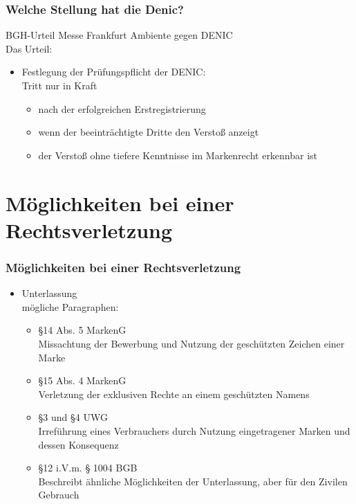 \documentclass{beamer}
\begin{document}
	\begin{frame}
		\frametitle{Welche Stellung hat die Denic?}
		BGH-Urteil \glqq Messe Frankfurt Ambiente gegen DENIC\grqq\\
		Das Urteil:
		\begin{itemize}
			\item Festlegung der Prüfungspflicht der DENIC:\\Tritt nur in Kraft
			\begin{itemize}
				\item nach der erfolgreichen Erstregistrierung
				\item wenn der beeinträchtigte Dritte den Verstoß anzeigt
				\item der Verstoß ohne tiefere Kenntnisse im Markenrecht erkennbar ist
			\end{itemize}
		\end{itemize}
	\end{frame}
	
	\section{Möglichkeiten bei einer Rechtsverletzung}
	
	\begin{frame}
		\frametitle{Möglichkeiten bei einer Rechtsverletzung}
		\begin{itemize}
			\item Unterlassung\\mögliche Paragraphen:
			\begin{itemize}
				\item §14 Abs. 5 MarkenG\\Missachtung der Bewerbung und Nutzung der geschützten Zeichen einer Marke
				\item §15 Abs. 4 MarkenG\\Verletzung der exklusiven Rechte an einem geschützten Namens
				\item §3 und §4 UWG\\Irreführung eines Verbrauchers durch Nutzung eingetragener Marken und dessen Konsequenz
				\item §12 i.V.m. § 1004 BGB\\Beschreibt ähnliche Möglichkeiten der Unterlassung, aber für den Zivilen Gebrauch
			\end{itemize}	
		\end{itemize}
	\end{frame}
	
\end{document}
